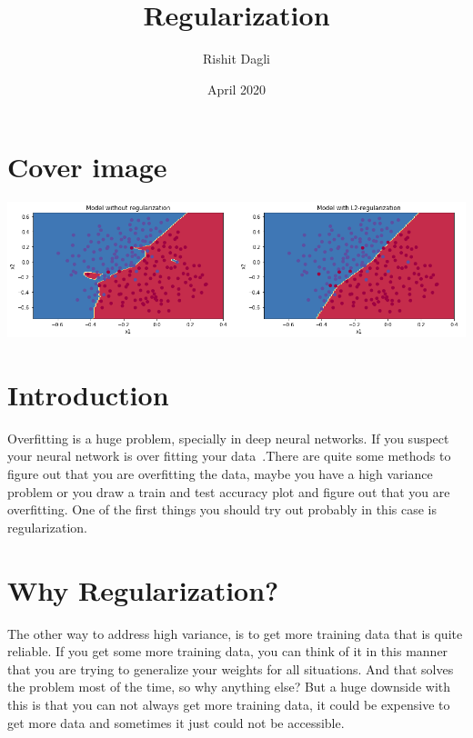 \documentclass{article}
\title{Regularization}
\author{Rishit Dagli}
\date{April 2020}
\begin{document}
\maketitle
\section{Cover image}
\vspace{5}

\includegraphics[width=\textwidth]{cover.png}

\maketitle
\section{Introduction}

Overfitting is a huge problem, specially in deep neural networks. If you suspect your neural network is over fitting your data .There are quite some methods to figure out that you are overfitting the data, maybe you have a high variance problem or you draw a train and test accuracy plot and figure out that you are overfitting. One of the first things you should try out probably in this case is regularization.

\maketitle
\section{Why Regularization?}

The other way to address high variance, is to get more training data that is quite reliable. If you get some more training data, you can think of it in this manner that you are trying to generalize your weights for all situations. And that solves the problem most of the time, so why anything else? But a huge downside with this is that you can not always get more training data, it could be expensive to get more data and sometimes it just could not be accessible.
\vspace{5}
\end{document}
